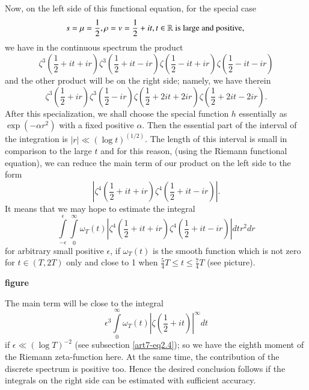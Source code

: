 Now, on the left side of this functional equation, for the special case
\begin{equation}
s = \mu =\frac{1}{2}, \rho = v = \frac{1}{2} + it, t \in \mathbb{R} \text{ is large and positive, }\label{art7-eq2.16}
\end{equation}
we have in the continuous spectrum the product
\begin{equation}
\zeta^3 (\frac{1}{2} + it + ir) \zeta^3 (\frac{1}{2} + it - ir) \zeta (\frac{1}{2} - it + ir) \zeta(\frac{1}{2} - it - ir) \label{art7-eq2.17}
\end{equation}
and the other product will be on the right side; namely, we have therein 
\begin{equation}
\zeta^3 (\frac{1}{2} + ir) \zeta^3 (\frac{1}{2} - ir) \zeta (\frac{1}{2} + 2 it + 2 ir) \zeta (\frac{1}{2} + 2 it - 2 ir). 
\label{art7-eq2.18}
\end{equation}
After this specialization, we shall choose the special function $h$ essentially as $\exp (-\alpha r^2)$ with a fixed positive $\alpha$. Then the essential part of the interval of the integration is $|r| \ll (\log t)^{(1/2)}$. The length of this interval is small in comparison to the large $t$ and for this reason, (using the Riemann functional equation), we can reduce the main term of our product on the left side to the form 
$$
|\zeta^4 (\frac{1}{2} + it + ir) \zeta^4 (\frac{1}{2} + it - ir)|. 
$$\pageoriginale
It means that we may hope to estimate the integral 
\begin{equation}
\int\limits^\epsilon_{-\epsilon} \int\limits^\infty_{0} \omega_T (t) |\zeta^4 (\frac{1}{2} + it+ ir) \zeta^4 (\frac{1}{2} + it - ir)| dt r^2 dr  \label{art7-eq2.19}
\end{equation}
for arbitrary small positive $\epsilon$, if $\omega_T (t)$ is the smooth function which is not zero for $t \in (T, 2 T)$ only and close to 1 when $\frac{5}{4} T \leqslant t \leqslant \frac{7}{4} T$ (see picture).
\begin{center}
{\bf figure}
\end{center}
The main term will be close to the integral
$$
\epsilon^3 \int\limits^\infty_0 \omega_T (t) |\zeta (\frac{1}{2} + it)|^\infty dt 
$$
if $\epsilon \ll (\log T)^{-2}$ (see subsection \eqref{art7-eq2.4}); so we have the eighth moment of the Riemann zeta-function here. At the same time, the contribution of the discrete spectrum is positive too. Hence the desired conclusion follows if the integrals on the right side can be estimated with sufficient accuracy. 

